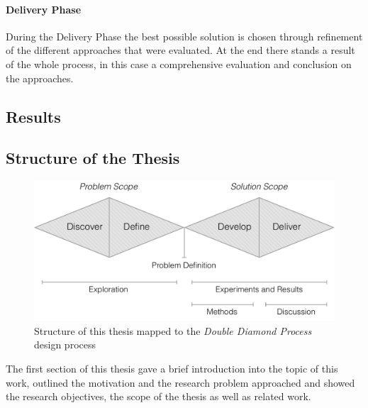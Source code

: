 \paragraph{Delivery Phase}
\label{par:Delivery Phase}
During the Delivery Phase the best possible solution is chosen through refinement of the different approaches that were evaluated. At the end there stands a result of the whole process, in this case a comprehensive evaluation and conclusion on the approaches.


\subsection{Results}



\subsection{Structure of the Thesis}

\begin{figure}[h]
    \centering
    \includegraphics[width=\textwidth]{img/double-diamond-with-structure}
    \caption{Structure of this thesis mapped to the \emph{Double Diamond Process} design process }
\label{fig:double-diamond-with-structure}
\end{figure}

The first section of this thesis gave a brief introduction into the topic of this work, outlined the motivation and the research problem approached and showed the research objectives, the scope of the thesis as well as related work.
